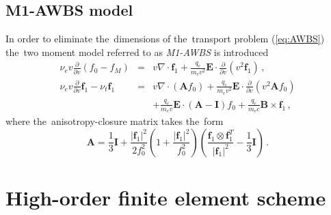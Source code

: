 \documentclass[review]{elsarticle}
\newcommand{\pdv}[2]{\frac{\partial{#1}}{\partial{#2}}}
\newcommand{\vect}[1]{\boldsymbol{#1}}
\newcommand{\matr}[1]{\mathbf{#1}}
\newcommand{\nue}{\nu_{e}}
\newcommand{\nutot}{\nu_{t}}
\newcommand{\vmag}{v}
\newcommand{\E}{\vect{E}}
\newcommand{\B}{\vect{B}}
\newcommand{\qe}{q_e}
\newcommand{\me}{m_e}
\newcommand{\fM}{f_M}
\newcommand{\fzero}{f_0}
\newcommand{\fone}{\vect{f}_1}
\newcommand{\MI}{\matr{I}}
\newcommand{\MA}{\matr{A}}
\renewcommand{\refeq}[1]{(\ref{#1})}
\begin{document}
\subsection{M1-AWBS model}
In order to eliminate the~dimensions of the~transport problem \refeq{eq:AWBS}
the~two moment model referred to as \textit{M1-AWBS} is introduced
\begin{eqnarray}
  \nue\vmag\pdv{}{\vmag}\left(\fzero - \fM \right) &=&
  \vmag\nabla\cdot\fone + \frac{\qe}{\me\vmag^2}\E\cdot\pdv{}{\vmag}
  \left( \vmag^2 \fone\right)\, , 
  \label{eq:M1f0}\\
  \nue\vmag\pdv{}{\vmag}\fone - \nutot\fone &=& 
  \vmag\nabla\cdot\left(\MA\fzero\right) + 
  \frac{\qe}{\me\vmag^2}\E\cdot\pdv{}{\vmag}
  \left( \vmag^2 \MA\fzero\right) \nonumber\\
  && + \frac{\qe}{\me\vmag}\E\cdot\left( \MA - \MI \right)\fzero +
  \frac{\qe}{\me c}\B\times\fone\, ,
  \label{eq:M1f1}
\end{eqnarray}
where the~anisotropy-closure matrix takes the~form
\begin{equation}
  \MA = \frac{1}{3}\MI + \frac{|\fone|^2}{2\fzero^2}
  \left( 1 + \frac{|\fone|^2}{\fzero^2} \right)
  \left( \frac{\fone\otimes\fone^T}{|\fone|^2} - \frac{1}{3}\MI\right)\, .
\end{equation}
\section{High-order finite element scheme}\label{sec:hos}

\end{document}
